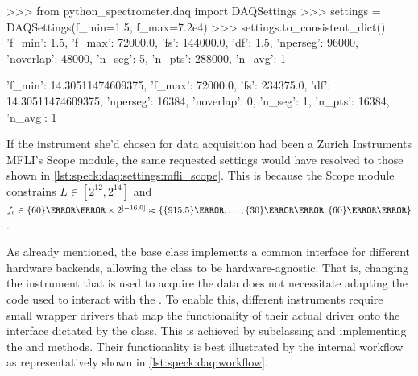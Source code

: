 \begin{listing}[htpb]
    \begin{pycode}
        >>> from python_spectrometer.daq import DAQSettings
        >>> settings = DAQSettings(f_min=1.5, f_max=7.2e4)
        >>> settings.to_consistent_dict()
        {'f_min': 1.5,
         'f_max': 72000.0,
         'fs': 144000.0,
         'df': 1.5,
         'nperseg': 96000,
         'noverlap': 48000,
         'n_seg': 5,
         'n_pts': 288000,
         'n_avg': 1}
    \end{pycode}
    \caption{
         example showcasing automatic parameter resolution.
         determines the number of outer averages, \ie, the number of data buffers acquired and processed individually.
    }
    \label{lst:speck:daq:settings}
\end{listing}

\begin{marginlisting}[*-7]
    \begin{pycode}[fontsize=\footnotesize]
    {'f_min': 14.30511474609375,
     'f_max': 72000.0,
     'fs': 234375.0,
     'df': 14.30511474609375,
     'nperseg': 16384,
     'noverlap': 0,
     'n_seg': 1,
     'n_pts': 16384,
     'n_avg': 1}
    \end{pycode}
    \caption{
        Resolved settings for the same input parameters as in \cref{lst:speck:daq:settings} but for the  backend with hardware constraints on  and .
    }
    \label{lst:speck:daq:settings:mfli_scope}
\end{marginlisting}

If the instrument she'd chosen for data acquisition had been a Zurich Instruments MFLI's Scope module,
the same requested settings would have resolved to those shown in \cref{lst:speck:daq:settings:mfli_scope}.
This is because the Scope module constrains $L\in[2^{12},2^{14}]$ and $\fs\in\qty{60}{\mega\hertz}\times 2^{[-16, 0]} \approx \allowbreak \lbrace \qty{915.5}{\hertz}, \allowbreak \dotsc, \allowbreak \qty{30}{\mega\hertz}, \qty{60}{\mega\hertz}\rbrace$.

As already mentioned, the  base class implements a common interface for different hardware backends, allowing the  class to be hardware-agnostic.
That is, changing the instrument that is used to acquire the data does not necessitate adapting the code used to interact with the .
To enable this, different instruments require small wrapper drivers that map the functionality of their actual driver onto the interface dictated by the  class.
This is achieved by subclassing  and implementing the  and  methods.
Their functionality is best illustrated by the internal workflow as representatively shown in \cref{lst:speck:daq:workflow}.

